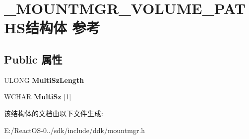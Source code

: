\hypertarget{struct___m_o_u_n_t_m_g_r___v_o_l_u_m_e___p_a_t_h_s}{}\section{\+\_\+\+M\+O\+U\+N\+T\+M\+G\+R\+\_\+\+V\+O\+L\+U\+M\+E\+\_\+\+P\+A\+T\+H\+S结构体 参考}
\label{struct___m_o_u_n_t_m_g_r___v_o_l_u_m_e___p_a_t_h_s}
\subsection*{Public 属性}
\begin{DoxyCompactItemize}
\item 
\mbox{\label{struct___m_o_u_n_t_m_g_r___v_o_l_u_m_e___p_a_t_h_s_abee73797ce5f1d8e7377318a4753532b}} 
U\+L\+O\+NG {\bfseries Multi\+Sz\+Length}
\item 
\mbox{\label{struct___m_o_u_n_t_m_g_r___v_o_l_u_m_e___p_a_t_h_s_ad9e2b199617a2c89845f9d8ad3424af8}} 
W\+C\+H\+AR {\bfseries Multi\+Sz} \mbox{[}1\mbox{]}
\end{DoxyCompactItemize}


该结构体的文档由以下文件生成\+:\begin{DoxyCompactItemize}
\item 
E\+:/\+React\+O\+S-\/0../sdk/include/ddk/mountmgr.\+h\end{DoxyCompactItemize}

